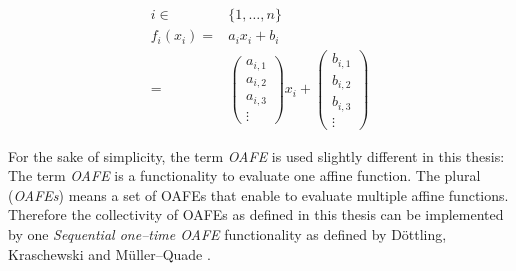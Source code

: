 \begin{align*}
  i \in& \{1, \ldots, n\}\\
%
  f_i(x_i) = &
  a_ix_i + b_i \\
%
  = &
\begin{pmatrix}a_{i,1}\\a_{i,2}\\a_{i,3}\\\vdots\end{pmatrix}x_i +
\begin{pmatrix}b_{i,1}\\b_{i,2}\\b_{i,3}\\\vdots\end{pmatrix}
\end{align*}

\noindent{}For the sake of simplicity, the term \emph{OAFE} is used slightly
different in this thesis: The term \emph{OAFE} is a functionality to evaluate
one affine function. The plural (\emph{OAFEs}) means a set of OAFEs that enable
to evaluate multiple affine functions. Therefore the collectivity of OAFEs as
defined in this thesis can be implemented by one \emph{Sequential one--time
OAFE} functionality as defined by Döttling, Kraschewski and Müller--Quade
\cite{davidgoliath}.


%
%
\label{sec:drav}


